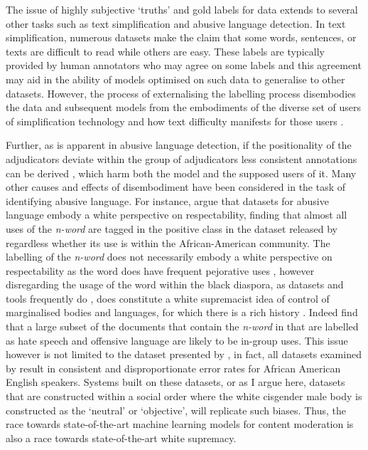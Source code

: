 
The issue of highly subjective `truths' and gold labels for data extends to several other tasks such as text simplification and abusive language detection. In text simplification, numerous datasets make the claim that some words, sentences, or texts are difficult to read while others are easy. These labels are typically provided by human annotators who may agree on some labels and this agreement may aid in the ability of models optimised on such data to generalise to other datasets. However, the process of externalising the labelling process disembodies the data and subsequent models from the embodiments of the diverse set of users of simplification technology and how text difficulty manifests for those users \citep{Bingel:2018}.

Further, as is apparent in abusive language detection, if the positionality of the adjudicators deviate within the group of adjudicators less consistent annotations can be derived \citep{Waseem:2016}, which harm both the model and the supposed users of it. Many other causes and effects of disembodiment have been considered in the task of identifying abusive language. For instance, \citet{Waseem:2018} argue that datasets for abusive language embody a white perspective on respectability, finding that almost all uses of the \textit{n-word} are tagged in the positive class in the dataset released by \citet{Davidson:2017} regardless whether its use is within the African-American community. The labelling of the \textit{n-word} does not necessarily embody a white perspective on respectability as the word does have frequent pejorative uses \citep{Croom:2013}, however disregarding the usage of the word within the black diaspora, as datasets and tools frequently do \citep{Davidson:2019}, does constitute a white supremacist idea of control of marginalised bodies and languages, for which there is a rich history \citep{Craft:2020}. Indeed \citet{Waseem:2018} find that a large subset of the documents that contain the \textit{n-word} in \citet{Davidson:2017} that are labelled as hate speech and offensive language are likely to be in-group uses. This issue however is not limited to the dataset presented by \citet{Davidson:2017}, in fact, all datasets examined by \citet{Davidson:2019} result in consistent and disproportionate error rates for African American English speakers. Systems built on these datasets, or as I argue here, datasets that are constructed within a social order where the white cisgender male body is constructed as the `neutral' or `objective', will replicate such biases. Thus, the race towards state-of-the-art machine learning models for content moderation is also a race towards state-of-the-art white supremacy.

